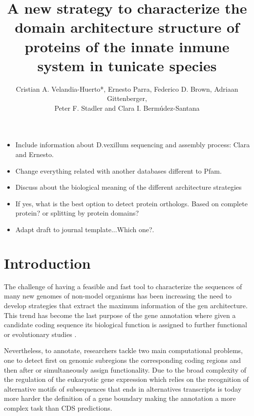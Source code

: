 \documentclass[11pt]{article}
\newcommand{\TODO}[1]{\begingroup\color{red}#1\endgroup}
\begin{document}
\title{A new strategy to characterize the domain architecture structure of 
proteins of the innate inmune system in tunicate species}
\author{Cristian A. Velandia-Huerto*, Ernesto Parra, Federico D. 
Brown, Adriaan Gittenberger, \\ Peter F. Stadler and Clara I. 
Berm\'{u}dez-Santana}


\maketitle

\begin{itemize}
\item \TODO{Include information about D.vexillum sequencing and assembly 
process: Clara and Ernesto.}
\item \TODO{Change everything related with another databases different to Pfam}. 
\item \TODO{Discuss about the biological meaning of the different architecture 
strategies}
\item \TODO{If yes, what is the best option to detect protein orthologs. Based 
on complete protein? or splitting  by protein domains?}
\item Adapt draft to journal template...\TODO{Which one?}. 
\end{itemize}

\section{Introduction}

The challenge of having a feasible and fast tool to characterize the sequences 
of many new genomes of non-model organisms has been increasing the need to 
develop strategies that extract the maximum information of the gen architecture. 
This trend has become the last purpose of the gene annotation where given a 
candidate coding sequence its biological function is assigned to further 
functional or evolutionary studies \cite{aken2016ensembl} 
\cite{birney2004overview} \cite{ashburner2000gene} \cite{tatusov2000cog} 
\cite{tatusova2016ncbi}. 

Nevertheless, to annotate, researchers tackle two main computational problems, 
one to detect first on genomic subregions the corresponding coding regions and 
then after or simultaneously assign functionality. Due to the broad complexity 
of the regulation of the eukaryotic gene expression which relies on 
the recognition of alternative motifs of subsequences that ends in alternatives 
transcripts is today more harder the definition of a gene boundary making the 
annotation a more complex task than CDS predictions\cite{yandell2012}. 
\end{document}
